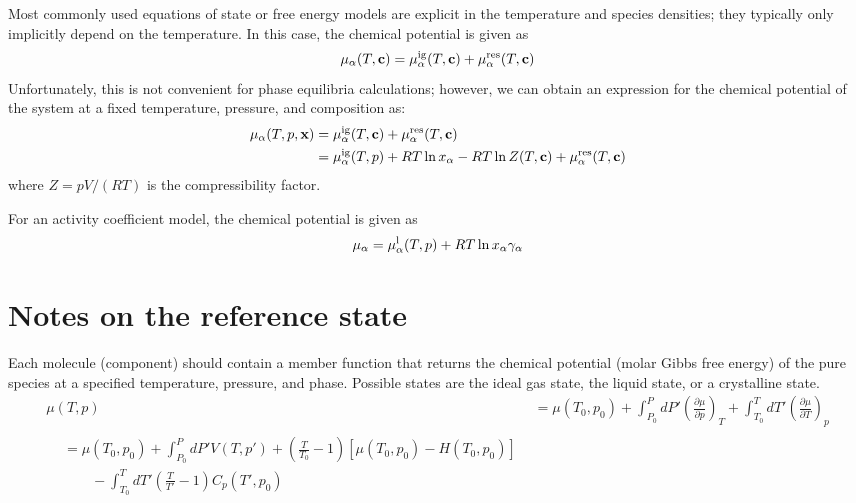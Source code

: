 \documentclass[12pt]{article}
\begin{document}
Most commonly used equations of state or free energy models are
explicit in the temperature and species densities; they typically only
implicitly depend on the temperature.  In this case, the chemical
potential is given as
\begin{equation}
\mu_\alpha(T,{\bf c}) = \mu_\alpha^{\rm ig}(T,{\bf c})
+ \mu_\alpha^{\rm res}(T,{\bf c})
\end{equation}
Unfortunately, this is not convenient for phase equilibria
calculations; however, we can obtain an expression for the chemical
potential of the system at a fixed temperature, pressure, and
composition as:
\begin{align*}
\mu_\alpha(T,p,{\bf x}) &= \mu_\alpha^{\rm ig}(T,{\bf c})
+ \mu_\alpha^{\rm res}(T,{\bf c})
\\
&= \mu_\alpha^{\rm ig}(T,p) + RT\ln x_\alpha
- RT\ln Z(T,{\bf c})
+ \mu_\alpha^{\rm res}(T,{\bf c})
\end{align*}
where $Z=pV/(RT)$ is the compressibility factor.


For an activity coefficient model, the chemical potential is given as
\begin{align}
\mu_\alpha = \mu_\alpha^{\rm l}(T,p)
+ RT \ln x_\alpha \gamma_\alpha
\end{align}


\section{Notes on the reference state}

Each molecule (component) should contain a member function that
returns the chemical potential (molar Gibbs free energy) of the pure
species at a specified temperature, pressure, and phase.  Possible
states are the ideal gas state, the liquid state, or a crystalline
state.
\begin{align}
\mu(T,p) &= \mu(T_0,p_0) 
+ \int_{P_0}^{P} dP' \left(\frac{\partial\mu}{\partial p}\right)_T 
+ \int_{T_0}^{T} dT' 
  \left(\frac{\partial \mu}{\partial T}\right)_p 
\nonumber
\\
\begin{split}
&= \mu(T_0,p_0) 
+ \int_{P_0}^{P} dP' V(T,p')
+ \left(\frac{T}{T_0}-1\right) [\mu(T_0,p_0)-H(T_0,p_0)]
\\ & \qquad
- \int_{T_0}^{T} dT' \left(\frac{T}{T'}-1\right) C_p(T',p_0)
\end{split}
\end{align}
\end{document}
